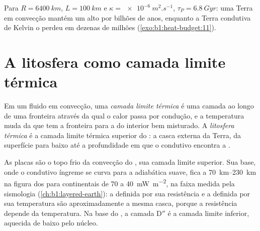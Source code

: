 Para $R = \qty{6400}{km}$, $L = \qty{100}{km}$ e $\kappa =
\qty{e-6}{m^2.s^{-1}}$, $\tau_P = \qty{6.8}{Gyr}$: uma Terra em convecção mantém um
 alto por bilhões de anos, enquanto a Terra condutiva de Kelvin o perdeu
em dezenas de milhões (\cref{exo:b1:heat-budget:11}).

\section{A litosfera como camada limite térmica}\label{sec:b1:heat-budget:boundary-layer}

\begin{definition}\label{def:b1:heat-budget:boundary-layer}
Em um fluido em convecção, uma \emph{camada limite térmica} é uma camada ao longo de uma fronteira através da qual o calor passa por condução, e
a temperatura muda da que tem a fronteira para a do interior bem misturado. A \emph{litosfera térmica} é a camada limite térmica superior
do : a casca externa da Terra, da superfície para baixo até a profundidade em que o  condutivo encontra a
.
\end{definition}

As placas são o topo frio da convecção do , sua camada limite superior. Sua base, onde o  condutivo íngreme se curva para a
adiabática suave, fica a \qtyrange{70}{230}{km} na figura dos 
para  continentais de 70 a \qty{40}{mW.m^{-2}}, na faixa medida
pela sismologia (\cref{ch:b1:layered-earth}): a  definida por sua
resistência e a  definida por sua temperatura são aproximadamente a mesma
casca, porque a resistência depende da temperatura. Na base do , a
camada D$''$ é a camada limite inferior, aquecida de baixo pelo núcleo.

